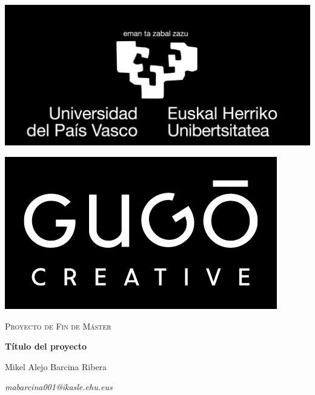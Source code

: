 \begin{titlepage}

  \pagecolor{black}\afterpage{\nopagecolor}
  \afterpage{\null\thispagestyle{empty}\newpage}

  \color{white}
  \centering

  \includegraphics[scale=0.2]{img/logo_upvehu}\par
  \includegraphics[scale=0.3]{img/logo_gugocreative}\par\vspace{1cm}

  \vspace{3cm}

  {\scshape\Large Proyecto de Fin de Máster \par}

  \vspace{1.5cm}

  {\Huge\bfseries Título del proyecto\par}

  \vfill

  \Large Mikel Alejo Barcina Ribera\par
  {\itshape mabarcina001@ikasle.ehu.eus}

\end{titlepage}
